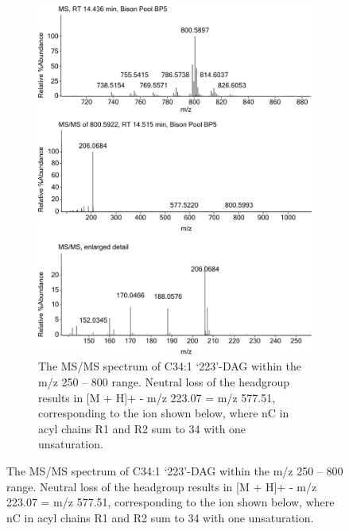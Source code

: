 \begin{figure}[h]
\centering
    \begin{subfigure}[b]{1\linewidth}
       \includegraphics[width=\linewidth]{figs_app1/223-DAG_1}
       \caption{The MS/MS spectrum of C34:1 ‘223’-DAG within the m/z 250 – 800 range. Neutral loss of the headgroup results in [M + H]+ - m/z 223.07 = m/z 577.51, corresponding to the ion shown below, where nC in acyl chains R1 and R2 sum to 34 with one unsaturation.}
        \label{fig:223-DAG-MS}
    \end{subfigure}
\end{figure}
\newpage
